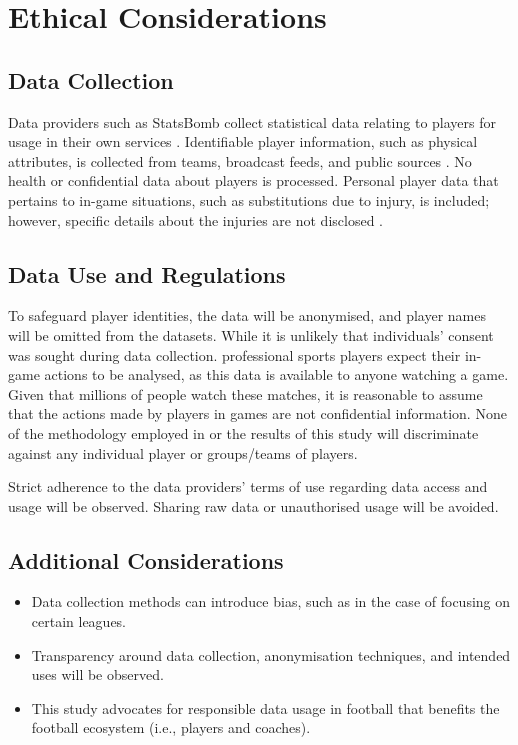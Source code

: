 \documentclass[12pt]{article}
\begin{document}
\section{Ethical Considerations}
\subsection{Data Collection}
Data providers such as StatsBomb collect statistical data relating to players for usage in their own services \citep{noauthor_statsbomb_2022}. Identifiable player information, such as physical attributes, is collected from teams, broadcast feeds, and public sources \citep{noauthor_statsbomb_2022}. No health or confidential data about players is processed. Personal player data that pertains to in-game situations, such as substitutions due to injury, is included; however, specific details about the injuries are not disclosed \cite{noauthor_statsbomb_2022}.

\subsection{Data Use and Regulations}
To safeguard player identities, the data will be anonymised, and player names will be omitted from the datasets. While it is unlikely that individuals' consent was sought during data collection. professional sports players expect their in-game actions to be analysed, as this data is available to anyone watching a game. Given that millions of people watch these matches, it is reasonable to assume that the actions made by players in games are not confidential information. None of the methodology employed in or the results of this study will discriminate against any individual player or groups/teams of players.

Strict adherence to the data providers' terms of use regarding data access and usage will be observed. Sharing raw data or unauthorised usage will be avoided.

\subsection{Additional Considerations}
\begin{itemize}
    \item Data collection methods can introduce bias, such as in the case of focusing on certain leagues.
    \item Transparency around data collection, anonymisation techniques, and intended uses will be observed.
    \item This study advocates for responsible data usage in football that benefits the football ecosystem (i.e., players and coaches).
\end{itemize}
\end{document}
